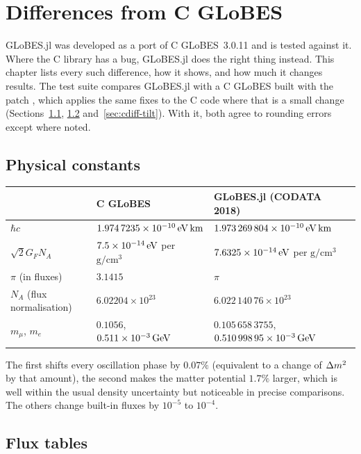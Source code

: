 \chapter{Differences from C GLoBES}\label{ch:cdiffs}

GLoBES.jl was developed as a port of C GLoBES~3.0.11 and is tested against it.
Where the C library has a bug, GLoBES.jl does the right thing instead. This
chapter lists every such difference, how it shows, and how much it changes
results. The test suite compares GLoBES.jl with a C GLoBES built with the
patch , which applies the same fixes to the
C code where that is a small change (Sections~\ref{sec:cdiff-constants},
\ref{sec:cdiff-flux} and~\ref{sec:cdiff-tilt}). With it, both agree to
rounding errors except where noted.

\section{Physical constants}\label{sec:cdiff-constants}

\begin{center}\small
\begin{tabular}{lll}
\toprule
& C GLoBES & GLoBES.jl (CODATA 2018) \\
\midrule
$\hbar c$ & $1.974\,7235\times10^{-10}\,\mathrm{eV}\,\mathrm{km}$ & $1.973\,269\,804\times10^{-10}\,\mathrm{eV}\,\mathrm{km}$ \\
$\sqrt2 G_F N_A$ & $7.5\times10^{-14}\,\mathrm{eV}$ per $\mathrm{g/cm^3}$ & $7.6325\times10^{-14}\,\mathrm{eV}$ per $\mathrm{g/cm^3}$ \\
$\pi$ (in fluxes) & $3.1415$ & $\pi$ \\
$N_A$ (flux normalisation) & $6.02204\times10^{23}$ & $6.022\,140\,76\times10^{23}$ \\
$m_\mu$, $m_e$ & $0.1056$, $0.511\times10^{-3}\,\mathrm{GeV}$ & $0.105\,658\,3755$, $0.510\,998\,95\times10^{-3}\,\mathrm{GeV}$ \\
\bottomrule
\end{tabular}
\end{center}
The first shifts every oscillation phase by $0.07\%$ (equivalent to a change of
$\Delta m^2_{}$ by that amount), the second makes the matter potential $1.7\%$ larger,
which is well within the usual density uncertainty but noticeable in precise
comparisons. The others change built-in fluxes by $10^{-5}$ to $10^{-4}$.

\section{Flux tables}\label{sec:cdiff-flux}

